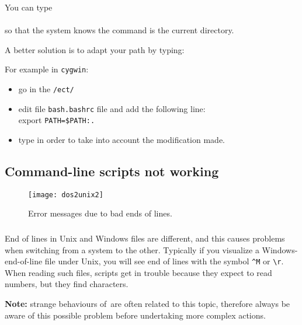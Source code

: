 You can type \\
\\
so that the system knows the command is the current directory.

A better solution is to adapt your path by typing:\\

For example in \texttt{cygwin}:\\
\begin{itemize}
\item go in the \texttt{/ect/}
\item edit file \texttt{bash.bashrc} file
and add the following line:\\
export \texttt{PATH=\$PATH:.}
\item type  in order to take into account the modification made.
\end{itemize}




\subsection{Command-line scripts not working}


\begin{figure}[htpb]
\centering
\texttt{[image: dos2unix2]}
\caption{Error messages due to bad ends of lines. \label{fig:error_dos2unix}}
\end{figure}

\subsubsection{\question}

End of lines in Unix and Windows files are different, and this causes problems when switching from a system to the other. Typically if you visualize a Windows-end-of-line file under Unix, you will see end of lines with the symbol \verb|^M| or \verb|\r|. When reading such files, scripts get in trouble because they expect to read numbers, but they find characters.

\textbf{Note:} strange behaviours of \diva\,are often related to this topic, therefore always be aware of this possible problem before undertaking more complex actions.

